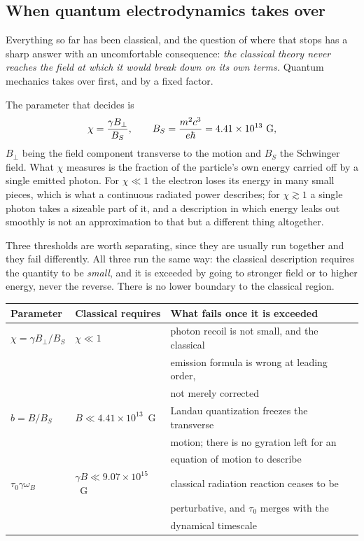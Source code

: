 \documentclass[preprint]{aastex701}
\newcommand{\taunought}{\tau_0}
\begin{document}
\subsection{When quantum electrodynamics takes over}
\label{sec:classquantum}

Everything so far has been classical, and the question of where that stops has
a sharp answer with an uncomfortable consequence: \emph{the classical theory
never reaches the field at which it would break down on its own terms.}
Quantum mechanics takes over first, and by a fixed factor.

The parameter that decides is
\begin{equation}
\chi = \frac{\gamma B_\perp}{B_S},
\qquad
B_S = \frac{m^2c^3}{e\hbar} = 4.41\times10^{13}~{\rm G},
\label{eq:chi}
\end{equation}
$B_\perp$ being the field component transverse to the motion and $B_S$ the
Schwinger field. What $\chi$ measures is the fraction of the particle's own
energy carried off by a single emitted photon. For $\chi\ll1$ the electron
loses its energy in many small pieces, which is what a continuous radiated
power describes; for $\chi\gtrsim1$ a single photon takes a sizeable part of
it, and a description in which energy leaks out smoothly is not an
approximation to that but a different thing altogether.

Three thresholds are worth separating, since they are usually run together and
they fail differently. All three run the same way: the classical description
requires the quantity to be \emph{small}, and it is exceeded by going to
stronger field or to higher energy, never the reverse. There is no lower
boundary to the classical region.

\begin{center}
\begin{tabular}{lll}
\toprule
Parameter & Classical requires & What fails once it is exceeded \\
\midrule
$\chi = \gamma B_\perp/B_S$ & $\chi\ll1$
  & photon recoil is not small, and the classical \\
 & & emission formula is wrong at leading order, \\
 & & not merely corrected \\[3pt]
$b = B/B_S$ & $B\ll4.41\times10^{13}$~G
  & Landau quantization freezes the transverse \\
 & & motion; there is no gyration left for an \\
 & & equation of motion to describe \\[3pt]
$\taunought\gamma\omega_B$ & $\gamma B\ll9.07\times10^{15}$~G
  & classical radiation reaction ceases to be \\
 & & perturbative, and $\taunought$ merges with the \\
 & & dynamical timescale \\
\bottomrule
\end{tabular}
\end{center}
\end{document}
